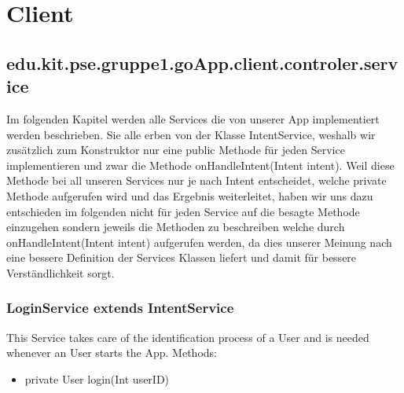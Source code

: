 
\section{Client} 
	\hypertarget{controler.service}{}
	\subsection{edu.kit.pse.gruppe1.goApp.client.controler.service}
	Im folgenden Kapitel werden alle Services die von unserer App implementiert werden beschrieben.
	Sie alle erben von der Klasse IntentService, weshalb wir zusätzlich zum Konstruktor nur eine public Methode für jeden Service implementieren und zwar die Methode onHandleIntent(Intent intent).
	Weil diese Methode bei all unseren Services nur je nach Intent entscheidet, welche private Methode aufgerufen wird und das Ergebnis weiterleitet, haben wir uns dazu entschieden im folgenden nicht für jeden Service auf die besagte Methode einzugehen sondern jeweils die Methoden zu beschreiben welche durch onHandleIntent(Intent intent) aufgerufen werden, da dies unserer Meinung nach eine bessere Definition der Services Klassen liefert und damit für bessere Verständlichkeit sorgt. 
	
	\subsubsection {LoginService extends IntentService}
		This Service takes care of the identification process of a User and is needed whenever an User starts the App.
	\newline Methods:
	\begin{itemize}
	\item private User login(Int userID)
	\end{itemize}
	
